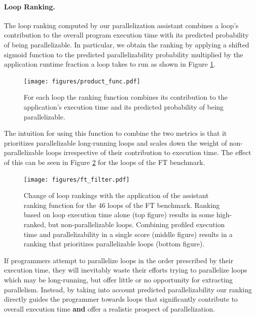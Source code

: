 \paragraph{Loop Ranking.}
The loop ranking computed by our parallelization assistant combines a loop's contribution to the overall program execution time with its predicted probability of being parallelizable. In particular, we obtain the ranking by applying a shifted sigmoid function to the predicted parallelizability probability multiplied by the application runtime fraction a loop takes to run as shown in Figure \ref{fig:sigmoid_3d}.
\begin{figure}[ht]
\texttt{[image: figures/product\_func.pdf]}
\caption{For each loop the ranking function combines its contribution to the application's execution time and its predicted probability of being parallelizable.}
\label{fig:sigmoid_3d}
\end{figure}

The intuition for using this function to combine the two metrics is that it prioritizes parallelizable long-running loops and scales down the weight of non-parallelizable loops irrespective of their contribution to execution time. The effect of this can be seen in Figure \ref{fig:ft_loop_ranking} for the loops of the FT benchmark.


\begin{figure}[ht]
\texttt{[image: figures/ft\_filter.pdf]}
\caption{Change of loop rankings with the application of the assistant ranking function for the 46 loops of the FT benchmark. Ranking based on loop execution time alone (top figure) results in some high-ranked, but non-parallelizable loops. Combining profiled execution time and parallelizability in a single score (middle figure) results in a ranking that prioritizes parallelizable loops (bottom figure).}
\label{fig:ft_loop_ranking}
\end{figure}

If programmers attempt to parallelize loops in the order prescribed by their execution time, they will inevitably waste
their efforts trying to parallelize loops which may be long-running, but offer little or no opportunity for extracting parallelism. Instead, by taking into account predicted parallelizability our ranking directly guides the programmer towards loops that significantly contribute to overall execution time \textbf{and} offer a realistic prospect of parallelization.


